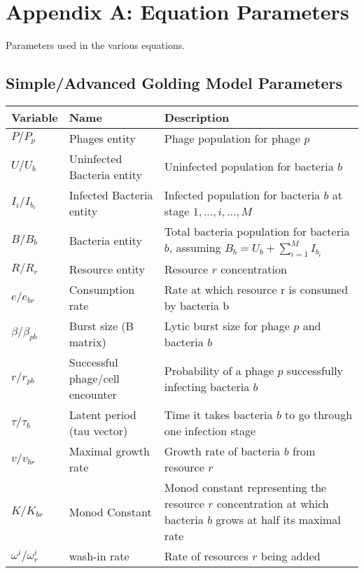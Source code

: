 \chapter{Appendix A: Equation Parameters}
\label{AppendixA}
Parameters used in the various equations. 

\section{Simple/Advanced Golding Model Parameters}
\begin{table}[h!]
    \small %
    \centering
    \begin{tabularx}{\textwidth}{l l X}
        \toprule
        \textbf{Variable} & \textbf{Name} & \textbf{Description} \\
        \midrule
        $P / P_p$ & Phages entity & Phage population for phage $p$ \\
        $U / U_b$ & Uninfected Bacteria entity & Uninfected population for bacteria $b$ \\
        $I_i / I_{b_i}$ & Infected Bacteria entity & Infected population for bacteria $b$ at stage $1, \dots, i, \dots, M$ \\
        $B / B_b$ & Bacteria entity & Total bacteria population for bacteria $b$, assuming $B_b = U_b + \sum_{i=1}^M I_{b_i}$ \\
        $R / R_r$ & Resource entity & Resource $r$ concentration\\
        $e / e_{b r}$ & Consumption rate& Rate at which resource r is consumed by bacteria b\\
        $\beta / \beta_{p b}$ & Burst size (B matrix)& Lytic burst size for phage $p$ and bacteria $b$\\
        $r / r_{p b}$ & Successful phage/cell encounter & Probability of a phage $p$ successfully infecting bacteria $b$\\
        $\tau / \tau_{b}$ & Latent period (tau vector)& Time it takes bacteria $b$ to go through one infection stage\\
        $v / v_{b r}$ & Maximal growth rate & Growth rate of bacteria $b$ from resource $r$ \\
        $K / K_{b r}$ & Monod Constant & Monod constant representing the resource $r$ concentration at which bacteria $b$ grows at half its maximal rate\\
        $\omega^i / \omega^i_r$ & wash-in rate & Rate of resources $r$ being added\\

\end{tabularx}
\end{table}
